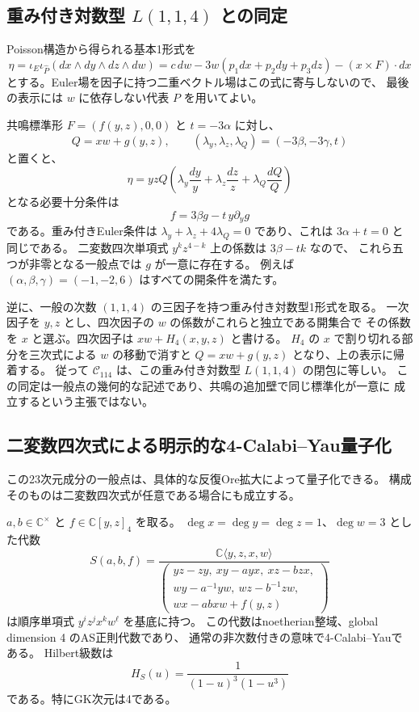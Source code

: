 \subsection{重み付き対数型 $L(1,1,4)$ との同定}
\label{subsec:log114-v32}

Poisson構造から得られる基本1形式を
\[
 \eta=\iota_E\iota_{\widehat P}
       (dx\wedge dy\wedge dz\wedge dw)
      =c\,dw-3w(p_1dx+p_2dy+p_3dz)-(x\times F)\cdot dx
\]
とする。Euler場を因子に持つ二重ベクトル場はこの式に寄与しないので、
最後の表示には $w$ に依存しない代表 $P$ を用いてよい。

共鳴標準形 $F=(f(y,z),0,0)$ と $t=-3\alpha$ に対し、
\[
 Q=xw+g(y,z),\qquad
 (\lambda_y,\lambda_z,\lambda_Q)=(-3\beta,-3\gamma,t)
\]
と置くと、
\[
 \eta=yzQ\left(\lambda_y\frac{dy}{y}+
                   \lambda_z\frac{dz}{z}+
                   \lambda_Q\frac{dQ}{Q}\right)
\]
となる必要十分条件は
\[
 f=3\beta g-t\,y\partial_y g
\]
である。重み付きEuler条件は
$\lambda_y+\lambda_z+4\lambda_Q=0$ であり、これは $3\alpha+t=0$ と同じである。
二変数四次単項式 $y^kz^{4-k}$ 上の係数は $3\beta-tk$ なので、
これら五つが非零となる一般点では $g$ が一意に存在する。
例えば $(\alpha,\beta,\gamma)=(-1,-2,6)$ はすべての開条件を満たす。

逆に、一般の次数 $(1,1,4)$ の三因子を持つ重み付き対数型1形式を取る。
一次因子を $y,z$ とし、四次因子の $w$ の係数がこれらと独立である開集合で
その係数を $x$ と選ぶ。四次因子は $xw+H_4(x,y,z)$ と書ける。
$H_4$ の $x$ で割り切れる部分を三次式による $w$ の移動で消すと
$Q=xw+g(y,z)$ となり、上の表示に帰着する。
従って $\mathscr C_{114}$ は、この重み付き対数型 $L(1,1,4)$ の閉包に等しい。
この同定は一般点の幾何的な記述であり、共鳴の追加壁で同じ標準化が一意に
成立するという主張ではない。

\subsection{二変数四次式による明示的な4-Calabi--Yau量子化}
\label{subsec:resonance-ore-cy-v32}

この23次元成分の一般点は、具体的な反復Ore拡大によって量子化できる。
構成そのものは二変数四次式が任意である場合にも成立する。

\begin{proposition}[二変数四次式のOre族]
\label{prop:binary-quartic-ore-v32}
$a,b\in\mathbb C^\times$ と $f\in\mathbb C[y,z]_4$ を取る。
$\deg x=\deg y=\deg z=1$、$\deg w=3$ とした代数
\[
 S(a,b,f)=\frac{\mathbb C\langle y,z,x,w\rangle}{
 \left(\begin{array}{c}
 yz-zy,\ xy-ayx,\ xz-bzx,\\
 wy-a^{-1}yw,\ wz-b^{-1}zw,\\
 wx-abxw+f(y,z)
 \end{array}\right)}
\]
は順序単項式 $y^iz^jx^kw^\ell$ を基底に持つ。
この代数はnoetherian整域、global dimension 4 のAS正則代数であり、
通常の非次数付きの意味で4-Calabi--Yauである。
Hilbert級数は
\[
 H_S(u)=\frac1{(1-u)^3(1-u^3)}
\]
である。特にGK次元は4である。
\end{proposition}

